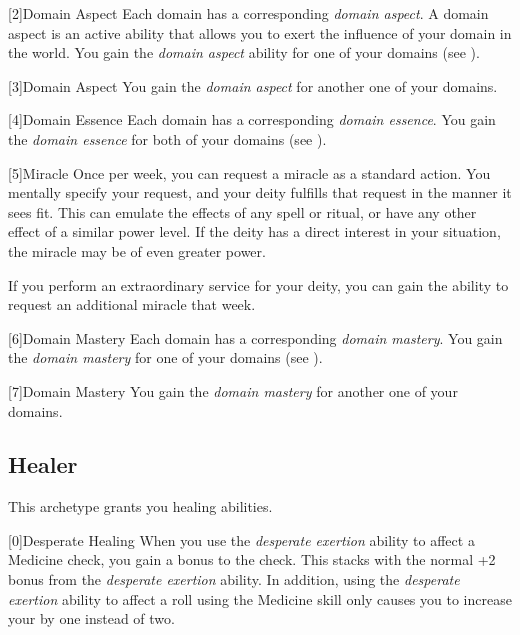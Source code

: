         [2]{Domain Aspect}
        Each domain has a corresponding \textit{domain aspect}.
        A domain aspect is an active ability that allows you to exert the influence of your domain in the world.
        You gain the \textit{domain aspect} ability for one of your domains (see ).

        [3]{Domain Aspect}
        You gain the \textit{domain aspect} for another one of your domains.

        [4]{Domain Essence}
        Each domain has a corresponding \textit{domain essence}.
        You gain the \textit{domain essence} for both of your domains (see ).

        [5]{Miracle}
        Once per week, you can request a miracle as a standard action.
        You mentally specify your request, and your deity fulfills that request in the manner it sees fit.
        This can emulate the effects of any spell or ritual, or have any other effect of a similar power level.
        If the deity has a direct interest in your situation, the miracle may be of even greater power.

        If you perform an extraordinary service for your deity, you can gain the ability to request an additional miracle that week.

        [6]{Domain Mastery}
        Each domain has a corresponding \textit{domain mastery}.
        You gain the \textit{domain mastery} for one of your domains (see ).

        [7]{Domain Mastery}
        You gain the \textit{domain mastery} for another one of your domains.

    \newpage
    \subsection{Healer}
        This archetype grants you healing abilities.

        [0]{Desperate Healing} When you use the \textit{desperate exertion} ability to affect a Medicine check, you gain a  bonus to the check.
        This stacks with the normal +2 bonus from the \textit{desperate exertion} ability.
        In addition, using the \textit{desperate exertion} ability to affect a roll using the Medicine skill only causes you to increase your  by one instead of two.

